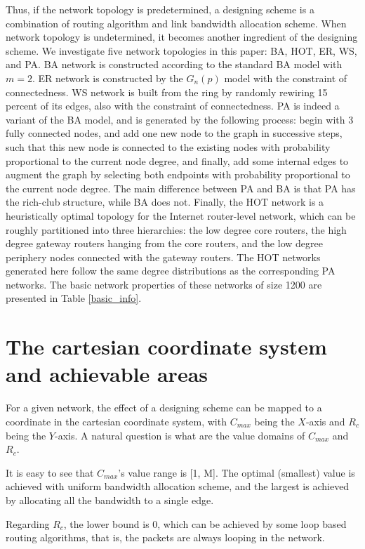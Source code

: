 \documentclass[journal]{IEEEtran}
\begin{document}
{Thus, if the network topology is predetermined, a designing scheme
is a combination of routing algorithm and link bandwidth allocation
scheme. When network topology is undetermined, it becomes another
ingredient of the designing scheme. We investigate five network
topologies in this paper: BA\cite{BA}, HOT\cite{HOT},
ER\cite{erdos59}, WS\cite{small-world1998}, and PA.  BA network is
constructed according to the standard BA model with $m=2$. ER
network is constructed by the $G_n(p)$ model with the constraint of
connectedness. WS network is built from the ring by randomly
rewiring 15 percent of its edges, also with the constraint of
connectedness. PA is indeed a variant of the BA model, and is
generated by the following process: begin with 3 fully connected
nodes, and add one new node to the graph in successive steps, such
that this new node is connected to the existing nodes with
probability proportional to the current node degree, and finally,
add some internal edges to augment the graph by selecting both
endpoints with probability proportional to the current node degree.
The main difference between PA and BA is that PA has the rich-club
structure\cite{rich-club}, while BA does not.  Finally, the HOT
network is a heuristically optimal topology for the Internet
router-level network, which can be roughly partitioned into three
hierarchies: the low degree core routers, the high degree gateway
routers hanging from the core routers, and the low degree periphery
nodes connected with the gateway routers. The HOT networks generated
here follow the same degree distributions as the corresponding PA
networks.  The basic network properties of these networks of size
1200 are presented in Table \ref{basic_info}.


\section{The cartesian coordinate system and achievable
areas}\label{coordinate-system}
 For a given network, the effect of a
designing scheme can be mapped to a coordinate in the cartesian
coordinate system, with $C_{max}$ being the $X$-axis and $R_c$ being
the $Y$-axis. A natural question is what are the value domains of
$C_{max}$ and $R_c$.

It is easy to see that $C_{max}$'s value range is [1, M]. The
optimal (smallest) value is achieved with uniform bandwidth
allocation scheme, and the largest is achieved by allocating all the
bandwidth to a single edge.

Regarding $R_c$, the lower bound is 0, which can be achieved by some
loop based routing algorithms, that is, the packets are always
looping in the network.

}
\end{document}
